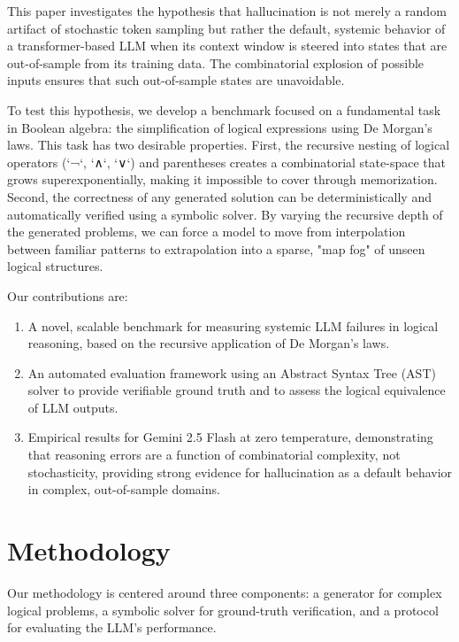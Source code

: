 \documentclass[11pt,a4paper]{article}
\begin{document}
This paper investigates the hypothesis that hallucination is not merely a random artifact of stochastic token sampling but rather the default, systemic behavior of a transformer-based LLM when its context window is steered into states that are out-of-sample from its training data. The combinatorial explosion of possible inputs ensures that such out-of-sample states are unavoidable.

To test this hypothesis, we develop a benchmark focused on a fundamental task in Boolean algebra: the simplification of logical expressions using De Morgan's laws. This task has two desirable properties. First, the recursive nesting of logical operators (`¬`, `∧`, `∨`) and parentheses creates a combinatorial state-space that grows superexponentially, making it impossible to cover through memorization. Second, the correctness of any generated solution can be deterministically and automatically verified using a symbolic solver. By varying the recursive depth of the generated problems, we can force a model to move from interpolation between familiar patterns to extrapolation into a sparse, "map fog" of unseen logical structures.

Our contributions are:
\begin{enumerate}
    \item A novel, scalable benchmark for measuring systemic LLM failures in logical reasoning, based on the recursive application of De Morgan's laws.
    \item An automated evaluation framework using an Abstract Syntax Tree (AST) solver to provide verifiable ground truth and to assess the logical equivalence of LLM outputs.
    \item Empirical results for Gemini 2.5 Flash at zero temperature, demonstrating that reasoning errors are a function of combinatorial complexity, not stochasticity, providing strong evidence for hallucination as a default behavior in complex, out-of-sample domains.
\end{enumerate}

\section{Methodology}
Our methodology is centered around three components: a generator for complex logical problems, a symbolic solver for ground-truth verification, and a protocol for evaluating the LLM's performance.
\end{document}
